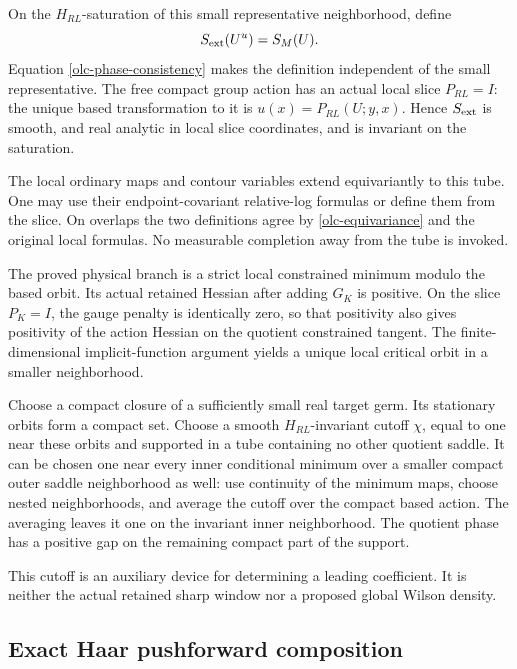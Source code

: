 \documentclass[11pt]{article}
\theoremstyle{remark}
\begin{document}
On the $H_{RL}$-saturation of this small representative
neighborhood, define
\begin{equation}
                       S_{\rm ext}(U^u)=S_M(U).
 \label{olc-extended-phase}
\end{equation}
Equation \eqref{olc-phase-consistency} makes the definition
independent of the small representative. The free compact
group action has an actual local slice $P_{RL}=I$: the unique
based transformation to it is $u(x)=P_{RL}(U;y,x)$.
Hence $S_{\rm ext}$ is smooth, and real analytic in local
slice coordinates, and is invariant on the saturation.

The local ordinary maps and contour variables extend
equivariantly to this tube. One may use their endpoint-covariant
relative-log formulas or define them from the slice. On
overlaps the two definitions agree by
\eqref{olc-equivariance} and the original local formulas.
No measurable completion away from the tube is invoked.

The proved physical branch is a strict local constrained
minimum modulo the based orbit. Its actual retained
Hessian after adding $G_K$ is positive. On the slice $P_K=I$,
the gauge penalty is identically zero, so that positivity
also gives positivity of the action Hessian on the quotient
constrained tangent. The finite-dimensional implicit-function
argument yields a unique local critical orbit in a smaller
neighborhood.

Choose a compact closure of a sufficiently small real target
germ. Its stationary orbits form a compact set. Choose a smooth
$H_{RL}$-invariant cutoff $\chi$, equal to one near these orbits
and supported in a tube containing no other quotient saddle.
It can be chosen one near every inner conditional minimum
over a smaller compact outer saddle neighborhood as well:
use continuity of the minimum maps, choose nested neighborhoods,
and average the cutoff over the compact based action.
The averaging leaves it one on the invariant inner neighborhood.
The quotient phase has a positive gap on the remaining compact
part of the support.

This cutoff is an auxiliary device for determining a leading
coefficient. It is neither the actual retained sharp window
nor a proposed global Wilson density.

\subsection{Exact Haar pushforward composition}
\label{olc-pushforward-section}
\end{document}
